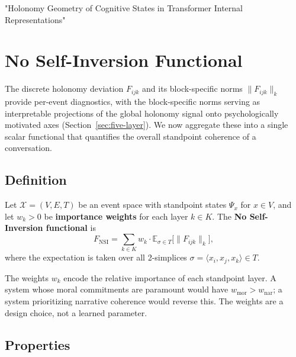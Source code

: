 "Holonomy Geometry of Cognitive States in Transformer Internal Representations"

\section{No Self-Inversion Functional}
\label{sec:fnsi}

The discrete holonomy deviation $F_{ijk}$ and its block-specific norms $\|F_{ijk}\|_k$
provide per-event diagnostics, with the block-specific norms serving as interpretable
projections of the global holonomy signal onto psychologically motivated axes
(Section~\ref{sec:five-layer}). We now aggregate these into a single scalar functional
that quantifies the overall standpoint coherence of a conversation.

\subsection{Definition}

\begin{definition}
\label{def:fnsi}
Let $\mathcal{X} = (V, E, T)$ be an event space with standpoint states $\Psi_x$ for
$x \in V$, and let $w_k > 0$ be \textbf{importance weights} for each layer $k \in K$.
The \textbf{No Self-Inversion functional} is
\[
    F_{\mathrm{NSI}} = \sum_{k \in K} w_k \cdot
    \mathbb{E}_{\sigma \in T}\!\big[\|F_{ijk}\|_k\big],
\]
where the expectation is taken over all 2-simplices $\sigma = \langle x_i, x_j, x_k
\rangle \in T$.
\end{definition}

The weights $w_k$ encode the relative importance of each standpoint layer. A system
whose moral commitments are paramount would have $w_{\mathrm{mor}} > w_{\mathrm{nar}}$;
a system prioritizing narrative coherence would reverse this. The weights are a design
choice, not a learned parameter.

\subsection{Properties}

